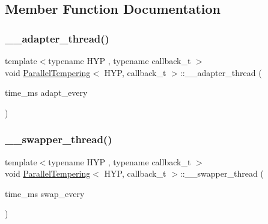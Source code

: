\subsection{Member Function Documentation}
\mbox{\label{class_parallel_tempering_a6ae6bd8581ec13aad5983886b1a739e6}} 
\subsubsection{\texorpdfstring{\+\_\+\+\_\+adapter\+\_\+thread()}{\_\_adapter\_thread()}}
{\footnotesize\ttfamily template$<$typename H\+YP , typename callback\+\_\+t $>$ \\
void \hyperlink{class_parallel_tempering}{Parallel\+Tempering}$<$ H\+YP, callback\+\_\+t $>$\+::\+\_\+\+\_\+adapter\+\_\+thread (\begin{DoxyParamCaption}\item[{time\+\_\+ms}]{adapt\+\_\+every }\end{DoxyParamCaption})\hspace{0.3cm}{\ttfamily [inline]}}

\mbox{\label{class_parallel_tempering_aa704d462a41cb45b461b967a97dedcbb}} 
\subsubsection{\texorpdfstring{\+\_\+\+\_\+swapper\+\_\+thread()}{\_\_swapper\_thread()}}
{\footnotesize\ttfamily template$<$typename H\+YP , typename callback\+\_\+t $>$ \\
void \hyperlink{class_parallel_tempering}{Parallel\+Tempering}$<$ H\+YP, callback\+\_\+t $>$\+::\+\_\+\+\_\+swapper\+\_\+thread (\begin{DoxyParamCaption}\item[{time\+\_\+ms}]{swap\+\_\+every }\end{DoxyParamCaption})\hspace{0.3cm}{\ttfamily [inline]}}

